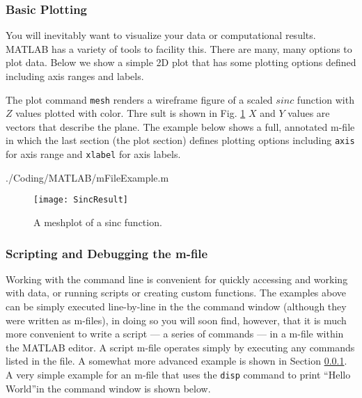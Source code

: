 \subsubsection{Basic Plotting} \label{subsubsection:BasicPlotting}

You will inevitably want to visualize your data or computational results. MATLAB has a variety of tools to facility this. There are many, many options to plot data. Below we show a simple 2D plot that has some plotting options defined including axis ranges and labels.

The plot command {\lstinline[style=Matlab-editor]!mesh!} renders a wireframe figure of a scaled $sinc$ function with $Z$ values plotted with color. Thre sult is shown in Fig. \ref{fig:SincPlot} $X$ and $Y$ values are vectors that describe the plane. The example below shows a full, annotated m-file in which the last section (the plot section) defines plotting options including {\lstinline[style=Matlab-editor]!axis!} for axis range and {\lstinline[style=Matlab-editor]!xlabel!} for axis labels. 
		
				
				{./Coding/MATLAB/mFileExample.m}
				
				
		\begin{figure}%
			\centering
			\texttt{[image: SincResult]}%
			\caption{A meshplot of a sinc function.}%
			\label{fig:SincPlot}%
		\end{figure}	
								
	\subsubsection{Scripting and Debugging the m-file} \label{subsubsection:mFile}

Working with the command line is convenient for quickly accessing and working with data, or running scripts or creating custom functions. The examples above can be simply executed line-by-line in the the command window (although they were written as m-files), in doing so you will soon find, however, that it is much more convenient to write a script --- a series of commands --- in a m-file within the MATLAB editor. A script m-file operates simply by executing any commands listed in the file. A somewhat more advanced example is shown in Section \ref{subsubsection:BasicPlotting}. A very simple example for an m-file that uses the {\lstinline[style=Matlab-editor]!disp!} command to print ``Hello World''in the command window is shown below.

